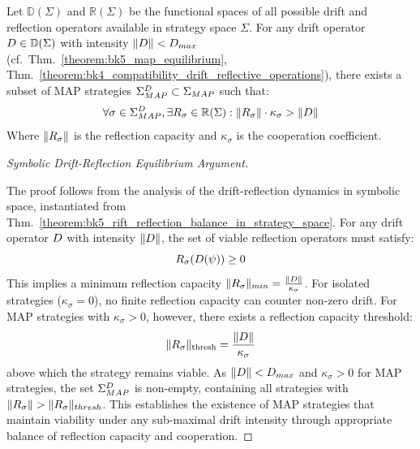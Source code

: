 \begin{theorem} \label{theorem:bk5_rift_reflection_balance_in_strategy_space}
Let $\mathbb{D}(\Sigma)$ and $\mathbb{R}(\Sigma)$ be the functional spaces of all possible drift and reflection operators available in strategy space $\Sigma$. For any drift operator $D \in \mathbb{D}(\Sigma)$ with intensity $\|D\| < D_{max}$ (cf.~Thm.~\ref{theorem:bk5_map_equilibrium}, Thm.~\ref{theorem:bk4_compatibility_drift_reflective_operations}), there exists a subset of MAP strategies $\Sigma_{MAP}^{D} \subset \Sigma_{MAP}$ such that:
\begin{equation}
\forall \sigma \in \Sigma_{MAP}^{D}, \exists R_\sigma \in \mathbb{R}(\Sigma) : \|R_\sigma\| \cdot \kappa_\sigma > \|D\|
\end{equation}
Where $\|R_\sigma\|$ is the reflection capacity and $\kappa_\sigma$ is the cooperation coefficient.
\end{theorem}
\begin{proof}[Symbolic Drift-Reflection Equilibrium Argument]
\label{proof:bk5_drift_reflection_equilibrium}
\leavevmode

The proof follows from the analysis of the drift-reflection dynamics in symbolic space, instantiated from Thm.~\ref{theorem:bk5_rift_reflection_balance_in_strategy_space}.
For any drift operator $D$ with intensity $\|D\|$, the set of viable reflection operators must satisfy:
\begin{equation}
R_\sigma(D(\psi)) \geq 0
\end{equation}
This implies a minimum reflection capacity $\|R_\sigma\|_{min} = \frac{\|D\|}{\kappa_\sigma}$.
For isolated strategies ($\kappa_\sigma = 0$), no finite reflection capacity can counter non-zero drift.
For MAP strategies with \( \kappa_\sigma > 0 \), however, there exists a reflection capacity threshold:
\[
\|R_\sigma\|_{\text{thresh}} = \frac{\|D\|}{\kappa_\sigma}
\]
above which the strategy remains viable.
As $\|D\| < D_{max}$ and $\kappa_\sigma > 0$ for MAP strategies, the set $\Sigma_{MAP}^{D}$ is non-empty, containing all strategies with $\|R_\sigma\| > \|R_\sigma\|_{thresh}$.
This establishes the existence of MAP strategies that maintain viability under any sub-maximal drift intensity through appropriate balance of reflection capacity and cooperation.
\end{proof}
